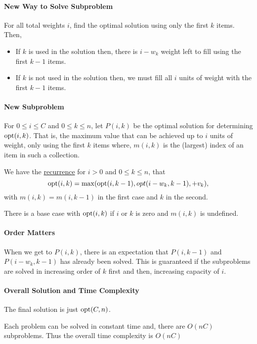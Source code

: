 \paragraph{New Way to Solve Subproblem}
For all total weights \(i\), find the optimal solution using only the first \(k\) items.
Then,
\begin{itemize}
  \item If \(k\) is used in the solution then, there is \(i - w_k\) weight left
    to fill using the first \( k - 1 \) items.
  \item If \(k\) is not used in the solution then, we must fill all  \(i\)
    units of weight with the first  \(k - 1\) items.
\end{itemize}

\paragraph{New Subproblem}
For \(0 \leq i \leq C\) and \(0 \leq k \leq n\), let  \(P(i, k)\) be the optimal
solution for determining  \(\mathrm{opt}(i, k)\). That is, the maximum value that can be achieved
up to  \(i\) units of weight, only using the first \(k\) items where, \(m(i, k)\) is the
(largest) index of an item in such a collection.

We have the \underline{recurrence} for \(i > 0\) and \(0 \leq k \leq n\), that  \[
  \mathrm{opt}(i, k) = \max (\mathrm{opt}(i, k - 1), opt(i - w_k, k - 1), + v_k),
\] with \(m(i, k) = m(i, k - 1)\) in the first case and \(k\) in the second.

There is a base case with \(\mathrm{opt}(i, k)\) if  \(i\) or \(k\) is zero and  \(m(i, k)\)
is undefined.

\paragraph{Order Matters}
When we get to \(P(i, k)\), there is an expectation that  \(P(i, k - 1)\)
and  \(P(i - w_k, k - 1)\) has already been solved.
This is guaranteed if the subproblems are solved in increasing order of \(k\)
first and then, increasing capacity of \(i\). 

\paragraph{Overall Solution and Time Complexity}
The final solution is just \(\mathrm{opt}(C, n)\). 

Each problem can be solved in constant time and, there are \(O(nC)\)
subproblems. Thus the overall time complexity is  \(O(nC)\)

